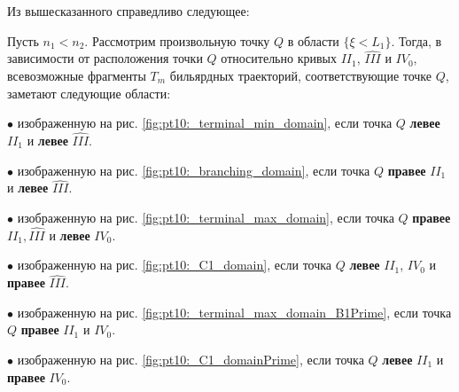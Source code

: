 Из вышесказанного справедливо следующее:
\begin{statement}
Пусть $n_1 < n_2$. Рассмотрим произвольную точку $Q$ в области $\{ \xi < L_1 \}$.
Тогда, в зависимости от расположения точки $Q$ относительно кривых $II_1$, $\widehat{III}$ и $IV_0$, всевозможные фрагменты $T_m$ бильярдных траекторий, соответствующие точке $Q$, заметают следующие области:

$\bullet$ изображенную на рис. \ref{fig:pt10:_terminal_min_domain}, если точка $Q$  \textbf{левее} $II_1$ и \textbf{левее} $\widehat{III}$.

$\bullet$ изображенную на рис. \ref{fig:pt10:_branching_domain}, если точка  $Q$  \textbf{правее} $II_1$ и \textbf{левее} $\widehat{III}$.

$\bullet$ изображенную на рис. \ref{fig:pt10:_terminal_max_domain}, если точка   $Q$ \textbf{правее} $II_1, \widehat{III}$ и \textbf{левее} $IV_0$.

$\bullet$ изображенную на рис.  \ref{fig:pt10:_C1_domain}, если точка  $Q$  \textbf{левее} $II_1$, $IV_0$ и \textbf{правее} $\widehat{III}$.

$\bullet$ изображенную на рис. \ref{fig:pt10:_terminal_max_domain_B1Prime}, если точка   $Q$ \textbf{правее} $II_1$ и $IV_0$.

$\bullet$ изображенную на рис.  \ref{fig:pt10:_C1_domainPrime}, если точка  $Q$ \textbf{левее} $II_1$ и  \textbf{правее} $IV_0$.


\end{statement}
